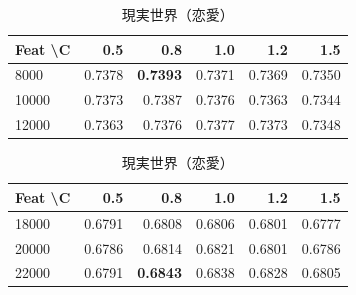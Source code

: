 \documentclass[uplatex, dvipdfmx, 11pt, a4paper, report]{jsbook}
\begin{document}
\begin{table}[H]
    \centering
    \small
    \begin{minipage}[t]{0.48\textwidth}
        \centering
        \caption{異世界（恋愛）}
        \begin{tabular}{l|rrrrr}
            \hline
            Feat \textbackslash C & 0.5 & 0.8 & 1.0 & 1.2 & 1.5 \\ \hline
            8000 & 0.7378 & \textbf{0.7393} & 0.7371 & 0.7369 & 0.7350 \\
            10000 & 0.7373 & 0.7387 & 0.7376 & 0.7363 & 0.7344 \\
            12000 & 0.7363 & 0.7376 & 0.7377 & 0.7373 & 0.7348 \\ \hline
        \end{tabular}
    \end{minipage}
    \hfill
    \begin{minipage}[t]{0.48\textwidth}
        \centering
        \caption{現実世界（恋愛）}
        \begin{tabular}{l|rrrrr}
            \hline
            Feat \textbackslash C & 0.5 & 0.8 & 1.0 & 1.2 & 1.5 \\ \hline
            18000 & 0.6791 & 0.6808 & 0.6806 & 0.6801 & 0.6777 \\
            20000 & 0.6786 & 0.6814 & 0.6821 & 0.6801 & 0.6786 \\
            22000 & 0.6791 & \textbf{0.6843} & 0.6838 & 0.6828 & 0.6805 \\ \hline
        \end{tabular}
    \end{minipage}
\end{table}
\end{document}
